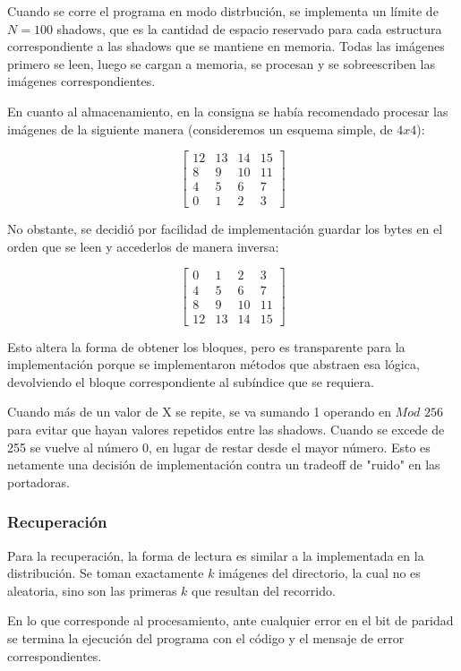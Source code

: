 \documentclass[11pt]{scrartcl} %
\begin{document}
Cuando se corre el programa en modo distrbución, se implementa un límite de $N = 100$ shadows, que es la cantidad de espacio reservado para cada estructura correspondiente a las shadows que se mantiene en memoria. Todas las imágenes primero se leen, luego se cargan a memoria, se procesan y se sobreescriben las imágenes correspondientes.

En cuanto al almacenamiento, en la consigna se había recomendado procesar las imágenes de la siguiente manera (consideremos un esquema simple, de $4x4$):

$$
\begin{bmatrix}
12 & 13 & 14 & 15 \\
8 & 9 & 10 & 11 \\
4 & 5 & 6 & 7 \\
0 & 1 & 2 & 3
\end{bmatrix}
$$

No obstante, se decidió por facilidad de implementación guardar los bytes en el orden que se leen y accederlos de manera inversa:

$$
\begin{bmatrix}
0 & 1 & 2 & 3 \\
4 & 5 & 6 & 7 \\
8 & 9 & 10 & 11 \\
12 & 13 & 14 & 15
\end{bmatrix}
$$

Esto altera la forma de obtener los bloques, pero es transparente para la implementación porque se implementaron métodos que abstraen esa lógica, devolviendo el bloque correspondiente al subíndice que se requiera.

Cuando más de un valor de X se repite, se va sumando 1 operando en $Mod$ $256$ para evitar que hayan valores repetidos entre las shadows. Cuando se excede de 255 se vuelve al número 0, en lugar de restar desde el mayor número. Esto es netamente una decisión de implementación contra un tradeoff de "ruido" en las portadoras.

\subsubsection{Recuperación}

Para la recuperación, la forma de lectura es similar a la implementada en la distribución. Se toman exactamente $k$ imágenes del directorio, la cual no es aleatoria, sino son las primeras $k$ que resultan del recorrido.

En lo que corresponde al procesamiento, ante cualquier error en el bit de paridad se termina la ejecución del programa con el código y el mensaje de error correspondientes.
\end{document}
